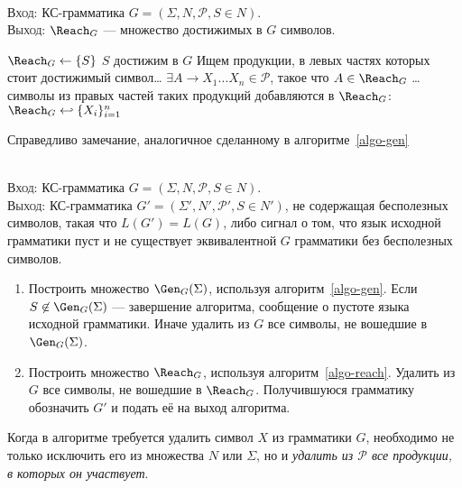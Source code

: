 \newcommand{\GenGS}{\ensuremath{\Gen_G(\Sigma)}}

\begin{NumAlgo}\label{algo-reach}
\nspace\\
\textsc{Вход}: КС-грамматика $G=(\Sigma, N, \mathcal P, S \in N)$.\\
\textsc{Выход}: $\Reach_G$  — множество достижимых в $G$ символов.
\begin{codebox}
\li $\Reach_G \gets \{ S \}$ \Comment $S$ достижим в $G$
\zi\Comment Ищем продукции, в левых частях которых стоит достижимый символ\ldots
\li \While $\exists A \to X_1 \ldots X_n \in \mathcal P$, такое что
    $A \in \Reach_G$
\zi \Comment \ldots символы из правых частей таких продукций добавляются
в $\Reach_G$: 
\zi     \Do 
        $\Reach_G \hookleftarrow \{ X_i \}_{i=1}^n$
        \End
    \End
\end{codebox}
\begin{Remark}
Справедливо замечание, аналогичное сделанному в алгоритме~\ref{algo-gen}
\end{Remark}
\end{NumAlgo}

\begin{NumAlgo}\label{algo-del-useless}
\nspace\\
\textsc{Вход}: КС-грамматика $G=(\Sigma, N, \mathcal P, S \in N)$.\\ 
\textsc{Выход}: КС-грамматика $G'=(\Sigma', N', \mathcal P', S \in N')$, не
содержащая бесполезных символов, такая что $L(G') = L(G)$, либо сигнал о том,
что язык исходной грамматики пуст и не существует эквивалентной $G$
грамматики без бесполезных символов.
\begin{enumerate}
  \item Построить множество \GenGS, используя алгоритм~\ref{algo-gen}. Если
  $S \not \in \GenGS$ — завершение алгоритма, сообщение о пустоте языка исходной
  грамматики. Иначе удалить из $G$ все символы, не вошедшие в \GenGS.
  \item Построить множество $\Reach_G$, используя алгоритм~\ref{algo-reach}.
  Удалить из $G$ все символы, не вошедшие в $\Reach_G$. Получившуюся грамматику
  обозначить $G'$ и подать её на выход алгоритма.
\end{enumerate}
\begin{Remark}
Когда в алгоритме требуется удалить символ $X$ из грамматики $G$, необходимо
не только исключить его из множества $N$ или $\Sigma$, но и \emph{удалить из
$\mathcal P$ все продукции, в которых он участвует}.
\end{Remark}
\end{NumAlgo}

